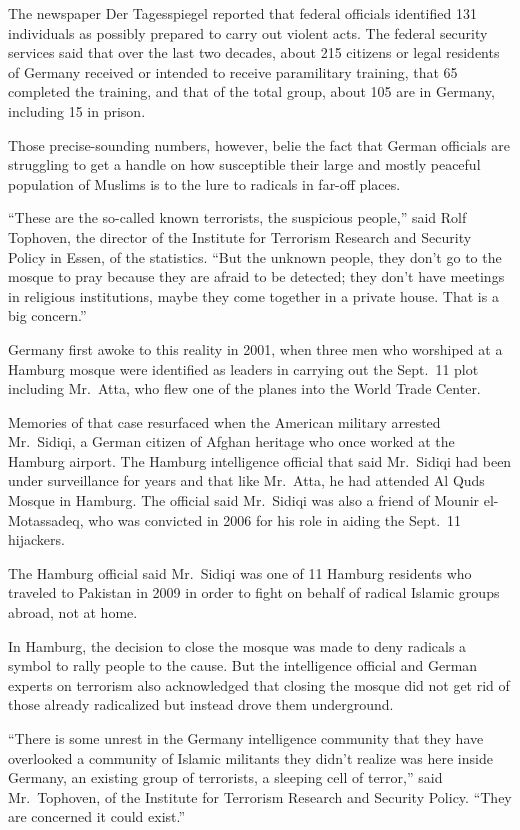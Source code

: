 ﻿\documentclass[12pt]{article}
\begin{document}
The newspaper Der Tagesspiegel reported that federal officials identified 131 individuals as
possibly prepared to carry out violent acts. The federal security services said that over the last
two decades, about 215 citizens or legal residents of Germany received or intended to receive
paramilitary training, that 65 completed the training, and that of the total group, about 105 are in
Germany, including 15 in prison.

Those precise-sounding numbers, however, belie the fact that German officials are struggling to get
a handle on how susceptible their large and mostly peaceful population of Muslims is to the lure to
radicals in far-off places.

``These are the so-called known terrorists, the suspicious people,'' said Rolf Tophoven, the
director of the Institute for Terrorism Research and Security Policy in Essen, of the statistics.
``But the unknown people, they don't go to the mosque to pray because they are afraid to be
detected; they don't have meetings in religious institutions, maybe they come together in a private
house. That is a big concern.''

Germany first awoke to this reality in 2001, when three men who worshiped at a Hamburg mosque were
identified as leaders in carrying out the Sept.~11 plot including Mr.~Atta, who flew one of the
planes into the World Trade Center.

Memories of that case resurfaced when the American military arrested Mr.~Sidiqi, a German citizen of
Afghan heritage who once worked at the Hamburg airport. The Hamburg intelligence official that said
Mr.~Sidiqi had been under surveillance for years and that like Mr.~Atta, he had attended Al Quds
Mosque in Hamburg. The official said Mr.~Sidiqi was also a friend of Mounir el-Motassadeq, who was
convicted in 2006 for his role in aiding the Sept.~11 hijackers.

The Hamburg official said Mr.~Sidiqi was one of 11 Hamburg residents who traveled to Pakistan in
2009 in order to fight on behalf of radical Islamic groups abroad, not at home.

In Hamburg, the decision to close the mosque was made to deny radicals a symbol to rally people to
the cause. But the intelligence official and German experts on terrorism also acknowledged that
closing the mosque did not get rid of those already radicalized but instead drove them underground.

``There is some unrest in the Germany intelligence community that they have overlooked a community
of Islamic militants they didn't realize was here inside Germany, an existing group of terrorists, a
sleeping cell of terror,'' said Mr.~Tophoven, of the Institute for Terrorism Research and Security
Policy. ``They are concerned it could exist.''
\end{document}
